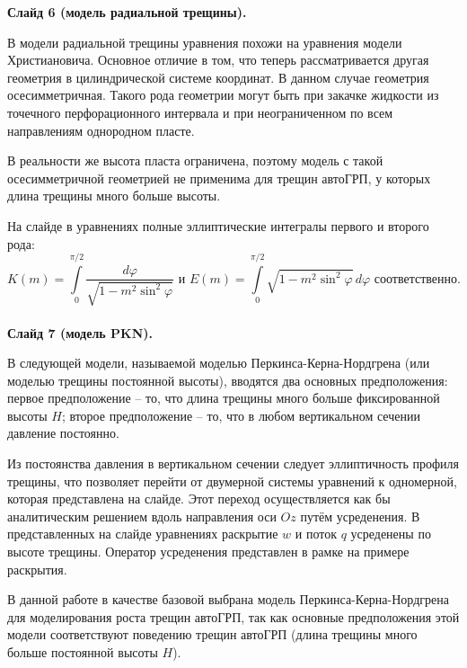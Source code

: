 \documentclass[a4paper, 12pt]{article}
\begin{document}
\textbf{Слайд 6 (модель радиальной трещины).}

В модели радиальной трещины уравнения похожи на уравнения модели Христиановича.
Основное отличие в том, что теперь рассматривается другая геометрия в цилиндрической системе координат.
В данном случае геометрия осесимметричная.
Такого рода геометрии могут быть при закачке жидкости из точечного перфорационного интервала и при неограниченном по всем направлениям однородном пласте.

В реальности же высота пласта ограничена, поэтому модель с такой осесимметричной геометрией не применима для трещин автоГРП, у которых длина трещины много больше высоты.

На слайде в уравнениях полные эллиптические интегралы первого и второго рода:
$$K(m)=\int\limits_{0}^{\pi/2}{\frac{d\varphi}{\sqrt{1-m^2\sin^2{\!\varphi}}}}\text{ и } E(m)=\int\limits_{0}^{\pi/2}{\sqrt{1-m^2\sin^2{\!\varphi}}\,d\varphi}\text{ соответственно.}$$\\

\textbf{Слайд 7 (модель PKN).}

В следующей модели, называемой моделью Перкинса-Керна-Нордгрена (или моделью трещины постоянной высоты), вводятся два основных предположения: первое предположение -- то, что длина трещины много больше фиксированной высоты $H$; второе предположение -- то, что в любом вертикальном сечении давление постоянно.

Из постоянства давления в вертикальном сечении следует эллиптичность профиля трещины, что позволяет перейти от двумерной системы уравнений к одномерной, которая представлена на слайде.
Этот переход осуществляется как бы аналитическим решением вдоль направления оси $Oz$ путём усреденения.
В представленных на слайде уравнениях раскрытие $w$ и поток $q$ усреденены по высоте трещины.
Оператор усреденения представлен в рамке на примере раскрытия.

В данной работе в качестве базовой выбрана модель Перкинса-Керна-Нордгрена для моделирования роста трещин автоГРП, так как основные предположения этой модели соответствуют поведению трещин автоГРП (длина трещины много больше постоянной высоты $H$).

\end{document}
